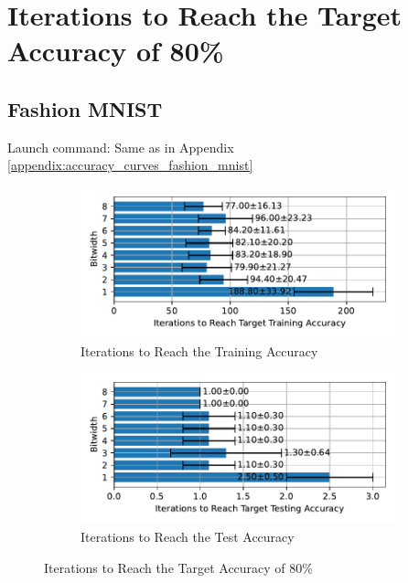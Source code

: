 \section{Iterations to Reach the Target Accuracy of 80\%}
\label{appendix:iterations}

    \subsection{Fashion MNIST}
    \label{appendix:iterations_fashion_mnist}
        Launch command: Same as in Appendix \ref{appendix:accuracy_curves_fashion_mnist}
        \begin{figure}[H]
            \centering
            \begin{subfigure}[H]{0.6\textwidth}
                \centering
                \includegraphics[width=\textwidth]{../standard/FashionMNIST/plots/fashionmnist_train_iters_horizontal.pdf}
                \caption{Iterations to Reach the Training Accuracy}
            \end{subfigure}
            \hfill
            \begin{subfigure}[H]{0.6\textwidth}
                \centering
                \includegraphics[width=\textwidth]{../standard/FashionMNIST/plots/fashionmnist_test_iters_horizontal.pdf}
                \caption{Iterations to Reach the Test Accuracy}
            \end{subfigure}
            \caption{Iterations to Reach the Target Accuracy of 80\%}
        \end{figure}

